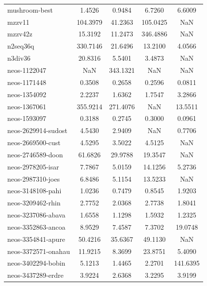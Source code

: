 \begin{longtable}{lcccc}
mushroom-best               &    1.4526 &   0.9484 &    6.7260 &    6.6009 \\
mzzv11                      &  104.3979 &  41.2363 &  105.0425 &       NaN \\
mzzv42z                     &   15.3192 &  11.2473 &  346.4886 &       NaN \\
n2seq36q                    &  330.7146 &  21.6496 &   13.2100 &    4.0566 \\
n3div36                     &   20.8316 &   5.5401 &    3.4873 &       NaN \\
neos-1122047                &       NaN & 343.1321 &       NaN &       NaN \\
neos-1171448                &    0.3508 &   0.2658 &    0.2596 &    0.0811 \\
neos-1354092                &    2.2237 &   1.6362 &    1.7547 &    3.2866 \\
neos-1367061                &  355.9214 & 271.4076 &       NaN &   13.5511 \\
neos-1593097                &    0.3188 &   0.2745 &    0.3000 &    0.0961 \\
neos-2629914-sudost         &    4.5430 &   2.9409 &       NaN &    0.7706 \\
neos-2669500-cust           &    4.5295 &   3.5022 &    4.5125 &       NaN \\
neos-2746589-doon           &   61.6826 &  29.9788 &   19.3547 &       NaN \\
neos-2978205-isar           &    7.7867 &   5.0159 &   14.1256 &    5.2736 \\
neos-2987310-joes           &    6.8486 &   5.1154 &   13.5233 &       NaN \\
neos-3148108-pahi           &    1.0236 &   0.7479 &    0.8545 &    1.9203 \\
neos-3209462-rhin           &    2.7752 &   2.0368 &    2.7738 &    1.8041 \\
neos-3237086-abava          &    1.6558 &   1.1298 &    1.5932 &    1.2325 \\
neos-3352863-ancoa          &    8.9529 &   7.4587 &    7.3702 &   19.0748 \\
neos-3354841-apure          &   50.4216 &  35.6367 &   49.1130 &       NaN \\
neos-3372571-onahau         &   11.9215 &   8.3699 &   23.8751 &    5.4090 \\
neos-3402294-bobin          &    5.1213 &   1.4465 &    2.2701 &  141.6395 \\
neos-3437289-erdre          &    3.9224 &   2.6368 &    3.2295 &    3.9199 \\

\end{longtable}
